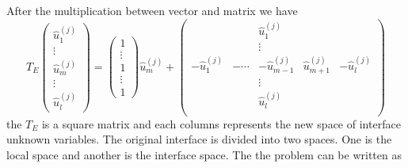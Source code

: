 After the multiplication between vector and matrix we have
\begin{equation}
T_{E} \begin{pmatrix}
\hat{u}_{1}^{(j)} \\ \vdots \\ \hat{u}_{m}^{(j)} \\ \vdots \\ \hat{u}_{l}^{(j)}
\end{pmatrix} = \begin{pmatrix}
1 \\ \vdots \\ 1 \\ \vdots \\ 1
\end{pmatrix} \hat{u}_{m}^{(j)} + \begin{pmatrix}
& & \hat{u}_{1}^{(j)} & & \\
& & \vdots & & \\
-\hat{u}_{1}^{(j)} & -\cdots & -\hat{u}_{m-1}^{(j)} & \hat{u}_{m+1}^{(j)} & -\hat{u}_{l}^{(j)}\\
& & \vdots & & \\
& & \hat{u}_{l}^{(j)} & & \\
\end{pmatrix}
\end{equation}
the $ T_{E} $ is a square matrix and each columns represents the new space of interface unknown variables. The original interface is divided into two spaces. One is the local space and another is the interface space. The the problem can be written as

